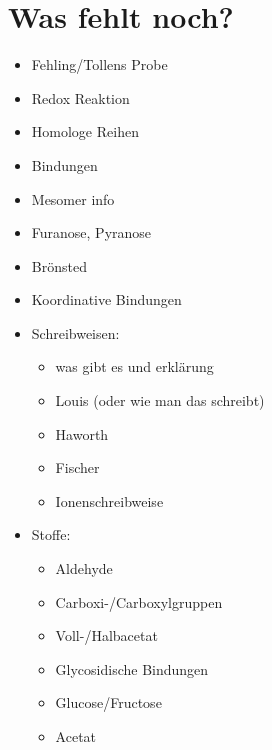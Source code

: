 
\chapter{Was fehlt noch?}
\begin{itemize}
    \item Fehling/Tollens Probe
    \item Redox Reaktion
    \item Homologe Reihen
    \item Bindungen
    \item Mesomer info
    \item Furanose, Pyranose
    \item Brönsted
    \item Koordinative Bindungen

    \item Schreibweisen:
    \begin{itemize}
        \item was gibt es und erklärung
        \item Louis (oder wie man das schreibt)
        \item Haworth
        \item Fischer
        \item Ionenschreibweise
    \end{itemize}
    \item Stoffe:
    \begin{itemize}
        \item Aldehyde
        \item Carboxi-/Carboxylgruppen
        \item Voll-/Halbacetat
        \item Glycosidische Bindungen
        \item Glucose/Fructose
        \item Acetat
    \end{itemize}
\end{itemize}

